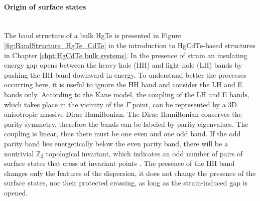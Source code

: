 \documentclass[titlepage,a4paper]{book}
\newcommand{\wciecie}{\quad\phantom{v}}
\newcommand{\myparagraph}[1]{\paragraph{#1}\mbox{}\\}
\begin{document}
\myparagraph{Origin of surface states}
\wciecie
The band structure of a bulk HgTe is presented in Figure \ref{fig:BandStructure_HgTe_CdTe} in the introduction to HgCdTe-based structures in Chapter \ref{chpt:HgCdTe bulk systems}. In the presence of strain an insulating energy gap opens between the heavy-hole (HH) and light-hole (LH) bands by pushing the HH band downward in energy. To understand better the processes occurring here, it is useful to ignore the HH band and consider the LH and E bands only. According to the Kane model, the coupling of the LH and E bands, which takes place in the vicinity of the $\Gamma$ point, can be represented by a 3D anisotropic massive Dirac Hamiltonian. The Dirac Hamiltonian conserves the parity symmetry, therefore the bands can be labeled by parity eigenvalues. The coupling is linear, thus there must be one even and one odd band. If the odd parity band lies energetically below the even parity band, there will be a nontrivial $\mathbb{Z}_2$ topological invariant, which indicates an odd number of pairs of surface states that cross at invariant points \cite{Dai_MCT_layers}\cite{Kane_Fu}. The presence of the HH band changes only the features of the dispersion, it does not change the presence of the surface states, nor their protected crossing, as long as the strain-induced gap is opened.

\end{document}
